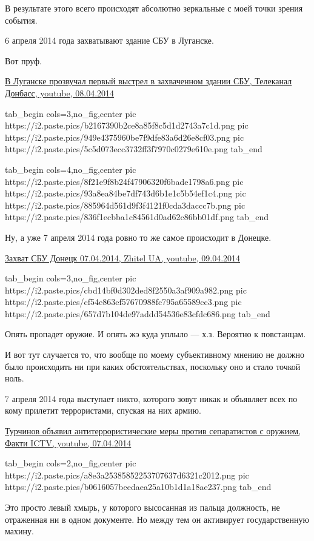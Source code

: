 В результате этого всего происходят абсолютно зеркальные с моей точки зрения
события.

6 апреля 2014 года захватывают здание СБУ в Луганске.

Вот пруф.

\href{https://www.youtube.com/watch?v=FsWl_rFQnyY}{%
В Луганске прозвучал первый выстрел в захваченном здании СБУ, Телеканал Донбасс, youtube, 08.04.2014%
}

\ifcmt
  tab_begin cols=3,no_fig,center
     pic https://i2.paste.pics/b2167390b2ce8a85f8c5d1d2743a7c1d.png
		 pic https://i2.paste.pics/949e4375960be7f9dfe83a6d26e8cf03.png
		 pic https://i2.paste.pics/5c5d073ecc3732ff3f7970c0279e610e.png
  tab_end

  tab_begin cols=4,no_fig,center
	   pic https://i2.paste.pics/8f21e9f8b24f47906320f6bade1798a6.png
		 pic https://i2.paste.pics/93a8ea84be7df743d6b1e1c5b54ef1c4.png
		 pic https://i2.paste.pics/885964d561d9f3f4121f0cda3daccc7b.png
		 pic https://i2.paste.pics/836f1ecbba1c84561d0ad62c86bb01df.png
  tab_end
\fi

Ну, а уже 7 апреля 2014 года ровно то же самое происходит в Донецке. 

\href{https://www.youtube.com/watch?v=Ir_u2B-VUwc}{%
Захват СБУ Донецк 07.04.2014, Zhitel UA, youtube, 09.04.2014%
}

\ifcmt
  tab_begin cols=3,no_fig,center
     pic https://i2.paste.pics/cbd14bf0d302ded8f2550a3af909a982.png
		 pic https://i2.paste.pics/cf54e863ef57670988fc795a65589cc3.png
		 pic https://i2.paste.pics/657d7b104de97addd54536e83cfdc686.png
  tab_end
\fi

Опять пропадет оружие. И опять жэ куда уплыло — х.з. Вероятно к повстанцам.

И вот тут случается то, что вообще по моему субъективному мнению не должно было
происходить ни при каких обстоятельствах, поскольку оно и стало точкой ноль.

7 апреля 2014 года выступает никто, которого зовут никак и объявляет всех по
кому прилетит террористами, спуская на них армию.

\href{https://www.youtube.com/watch?v=myjnfelp_V0}{%
Турчинов объявил антитеррористические меры против сепаратистов с оружием, %
Факти ICTV, youtube, 07.04.2014%
}

\ifcmt
  tab_begin cols=2,no_fig,center
		 pic https://i2.paste.pics/a8e3a25385852253707637d6321c2012.png
     pic https://i2.paste.pics/b0616057beedaea25a10b1d1a18ae237.png
  tab_end
\fi

Это просто левый хмырь, у которого высосанная из пальца должность, не
отраженная ни в одном документе. Но между тем он активирует государственную
махину.

